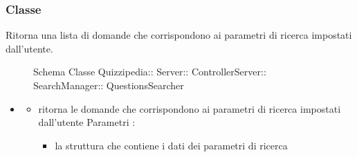\subsubsection{Classe }
Ritorna una lista di domande che corrispondono ai parametri di ricerca impostati dall'utente.
\begin{figure}[H]
\centering
\noindent{}
\caption[Schema Classe QuestionsSearcher]{Schema Classe Quizzipedia:: Server:: ControllerServer:: SearchManager:: QuestionsSearcher}
\end{figure}
\begin{itemize}
\item {}
\begin{itemize}
\item {}
\newline
ritorna le domande che corrispondono ai parametri di ricerca impostati dall'utente
\newline
Parametri :
\begin{itemize}
\item {}
\newline
la struttura che contiene i dati dei parametri di ricerca
\end{itemize}
\end{itemize}
\end{itemize}
